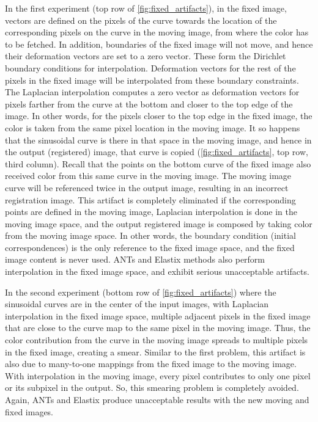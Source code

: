 In the first experiment (top row of \autoref{fig:fixed_artifacts}), in the fixed image, vectors are defined on the pixels of the curve towards the location of the corresponding pixels on the curve in the moving image, from where the color has to be fetched. In addition, boundaries of the fixed image will not move, and hence their deformation vectors are set to a zero vector. These form the Dirichlet boundary conditions for interpolation. Deformation vectors for the rest of the pixels in the fixed image will be interpolated from these boundary constraints. The Laplacian interpolation computes a zero vector as deformation vectors for pixels farther from the curve at the bottom and closer to the top edge of the image. In other words, for the pixels closer to the top edge in the fixed image, the color is taken from the same pixel location in the moving image. It so happens that the sinusoidal curve is there in that space in the moving image, and hence in the output (registered) image, that curve is copied (\autoref{fig:fixed_artifacts}, top row, third column). Recall that the points on the bottom curve of the fixed image also received color from this same curve in the moving image. The moving image curve will be referenced twice in the output image, resulting in an incorrect registration image. This artifact is completely eliminated if the corresponding points are defined in the moving image, Laplacian interpolation is done in the moving image space, and the output registered image is composed by taking color from the moving image space. In other words, the boundary condition (initial correspondences) is the only reference to the fixed image space, and the fixed image content is never used. ANTs and Elastix methods also perform interpolation in the fixed image space, and exhibit serious unacceptable artifacts. 

In the second experiment (bottom row of \autoref{fig:fixed_artifacts}) where the sinusoidal curves are in the center of the input images, with Laplacian interpolation in the fixed image space, multiple adjacent pixels in the fixed image that are close to the curve map to the same pixel in the moving image. Thus, the color contribution from the curve in the moving image spreads to multiple pixels in the fixed image, creating a smear. Similar to the first problem, this artifact is also due to many-to-one mappings from the fixed image to the moving image. With interpolation in the moving image, every pixel contributes to only one pixel or its subpixel in the output. So, this smearing problem is completely avoided. Again, ANTs and Elastix produce unacceptable results with the new moving and fixed images.
 

